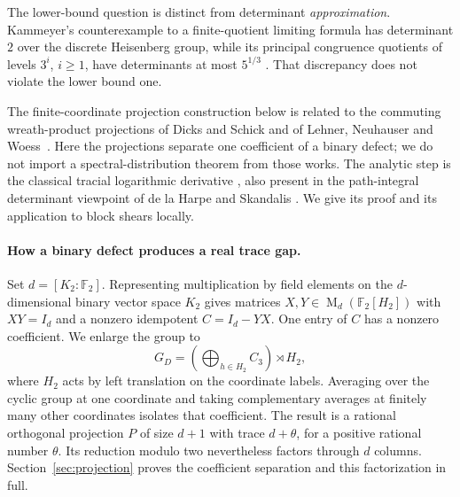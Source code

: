 \documentclass[11pt]{article}
\theoremstyle{remark}
\numberwithin{equation}{section}
\newcommand{\F}{\mathbb F}
\newcommand{\Mat}{\operatorname{M}}
\begin{document}
The lower-bound question is distinct from determinant
\emph{approximation}. Kammeyer's counterexample to a finite-quotient
limiting formula has determinant $2$ over the discrete Heisenberg
group, while its principal congruence quotients of levels $3^i$, $i\ge1$,
have determinants at most $5^{1/3}$
\cite[Theorem 2 and Section 2]{Kammeyer2026}. That discrepancy does not violate
the lower bound one.

The finite-coordinate projection construction below is related to
the commuting wreath-product projections of Dicks and Schick
\cite[Section 3]{DicksSchick2002} and of Lehner, Neuhauser and
Woess~\cite[Section 2]{LehnerNeuhauserWoess2008}. Here the
projections separate one coefficient of a binary defect; we do not
import a spectral-distribution theorem from those works. The
analytic step is the classical tracial logarithmic derivative
\cite[Lemma 2]{FK1952}, also present in the path-integral determinant
viewpoint of de la Harpe and Skandalis
\cite[Lemma 1 and Proposition 2(d)]{deLaHarpeSkandalis1984}. We give its proof and its
application to block shears locally.

\paragraph{How a binary defect produces a real trace gap.}
Set $d=[K_2:\F_2]$. Representing multiplication by field elements
on the $d$-dimensional binary vector space $K_2$ gives matrices
$X,Y\in\Mat_d(\F_2[H_2])$ with $XY=I_d$ and a nonzero idempotent
$C=I_d-YX$. One entry of $C$ has a nonzero coefficient. We enlarge
the group to
\[
 G_D=\left(\bigoplus_{h\in H_2}C_3\right)\rtimes H_2,
\]
where $H_2$ acts by left translation on the coordinate labels. Averaging over the
cyclic group at one coordinate and taking complementary averages
at finitely many other coordinates isolates that coefficient.
The result is a rational orthogonal projection $P$ of size $d+1$
with trace $d+\theta$, for a positive rational number $\theta$.
Its reduction modulo two nevertheless factors through $d$ columns.
Section~\ref{sec:projection} proves the coefficient separation and
this factorization in full.
\end{document}
